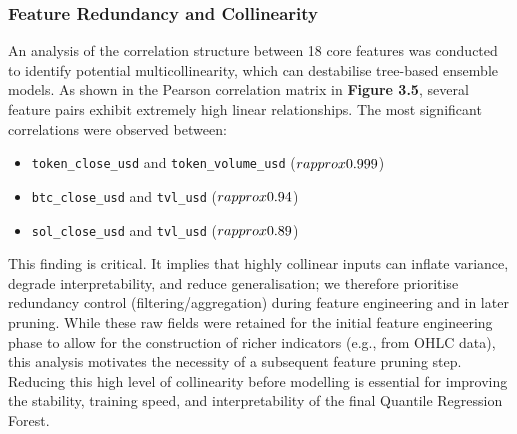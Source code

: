 \documentclass[
  a4paper,
  DIV=11,
  numbers=noendperiod]{scrreprt}
\providecommand{\tightlist}{%
  \setlength{\itemsep}{0pt}\setlength{\parskip}{0pt}}
\begin{document}
\subsubsection{Feature Redundancy and
Collinearity}\label{feature-redundancy-and-collinearity}

An analysis of the correlation structure between 18 core features was
conducted to identify potential multicollinearity, which can destabilise
tree-based ensemble models. As shown in the Pearson correlation matrix
in \textbf{Figure 3.5}, several feature pairs exhibit extremely high
linear relationships. The most significant correlations were observed
between:

\begin{itemize}
\tightlist
\item
  \texttt{token\_close\_usd} and \texttt{token\_volume\_usd}
  (\(r \\approx 0.999\))
\item
  \texttt{btc\_close\_usd} and \texttt{tvl\_usd} (\(r \\approx 0.94\))
\item
  \texttt{sol\_close\_usd} and \texttt{tvl\_usd} (\(r \\approx 0.89\))
\end{itemize}

This finding is critical. It implies that highly collinear inputs can
inflate variance, degrade interpretability, and reduce generalisation;
we therefore prioritise redundancy control (filtering/aggregation)
during feature engineering and in later pruning. While these raw fields
were retained for the initial feature engineering phase to allow for the
construction of richer indicators (e.g., from OHLC data), this analysis
motivates the necessity of a subsequent feature pruning step. Reducing
this high level of collinearity before modelling is essential for
improving the stability, training speed, and interpretability of the
final Quantile Regression Forest.
\end{document}
